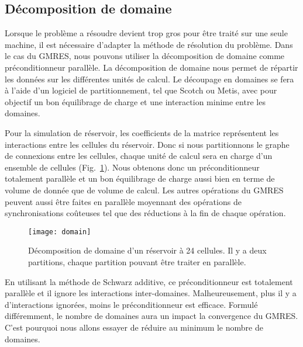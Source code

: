 \subsection{Décomposition de domaine}
Lorsque le problème a résoudre devient trop gros pour être traité sur une seule machine, il est nécessaire d'adapter la méthode de résolution du problème.
%
Dans le cas du GMRES, nous pouvons utiliser la décomposition de domaine comme préconditionneur parallèle.
%
La décomposition de domaine nous permet de répartir les données sur les différentes unités de calcul.
%
Le découpage en domaines se fera à l'aide d'un logiciel de partitionnement, tel que Scotch ou Metis, avec pour objectif un bon équilibrage de charge et une interaction minime entre les domaines.


Pour la simulation de réservoir, les coefficients de la matrice représentent les interactions entre les cellules du réservoir.
%
Donc si nous partitionnons le graphe de connexions entre les cellules, chaque unité de calcul sera en charge d'un ensemble de cellules (Fig.~\ref{fig:domain}).
%
Nous obtenons donc un préconditionneur totalement parallèle et un bon équilibrage de charge aussi bien en terme de volume de donnée que de volume de calcul.
%
Les autres opérations du GMRES peuvent aussi être faites en parallèle moyennant des opérations de synchronisations coûteuses tel que des réductions à la fin de chaque opération.

\begin{figure}[t!]
  \centering
  \texttt{[image: domain]}
  \caption{Décomposition de domaine d'un réservoir à 24 cellules. Il y a deux partitions, chaque partition pouvant être traiter en parallèle.}
  \label{fig:domain}
\end{figure}

En utilisant la méthode de Schwarz additive, ce préconditionneur est totalement parallèle et il ignore les interactions inter-domaines.
%
Malheureusement, plus il y a d'interactions ignorées, moins le préconditionneur est efficace.
%
Formulé différemment, le nombre de domaines aura un impact la convergence du GMRES.
%
C'est pourquoi nous allons essayer de réduire au minimum le nombre de domaines.
